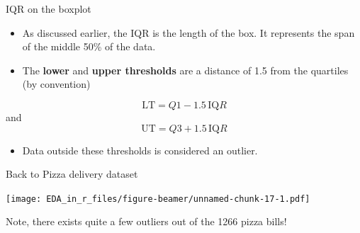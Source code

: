\documentclass[ignorenonframetext,]{beamer}
\newenvironment{Shaded}{\begin{snugshade}}{\end{snugshade}}
\newcommand{\KeywordTok}[1]{\textcolor[rgb]{0.13,0.29,0.53}{\textbf{#1}}}
\newcommand{\DataTypeTok}[1]{\textcolor[rgb]{0.13,0.29,0.53}{#1}}
\newcommand{\DecValTok}[1]{\textcolor[rgb]{0.00,0.00,0.81}{#1}}
\newcommand{\FloatTok}[1]{\textcolor[rgb]{0.00,0.00,0.81}{#1}}
\newcommand{\StringTok}[1]{\textcolor[rgb]{0.31,0.60,0.02}{#1}}
\newcommand{\OperatorTok}[1]{\textcolor[rgb]{0.81,0.36,0.00}{\textbf{#1}}}
\newcommand{\NormalTok}[1]{#1}
\providecommand{\tightlist}{%
  \setlength{\itemsep}{0pt}\setlength{\parskip}{0pt}}
\begin{document}
\begin{frame}{IQR on the boxplot}

\begin{itemize}
\item
  As discussed earlier, the IQR is the length of the box. It represents
  the span of the middle 50\% of the data.
\item
  The \textbf{lower} and \textbf{upper thresholds} are a distance of 1.5
  from the quartiles (by convention)
\end{itemize}

\[ \text{LT}=Q1-1.5\, \text{IQ}R \] and
\[ \text{UT}=Q3+1.5\, \text{IQ}R \]

\begin{itemize}
\tightlist
\item
  Data outside these thresholds is considered an outlier.
\end{itemize}

\end{frame}

\begin{frame}[fragile]{Back to Pizza delivery dataset}

\begin{Shaded}
\end{Shaded}

\texttt{[image: EDA\_in\_r\_files/figure-beamer/unnamed-chunk-17-1.pdf]}

Note, there exists quite a few outliers out of the 1266 pizza bills!

\end{frame}
\end{document}

